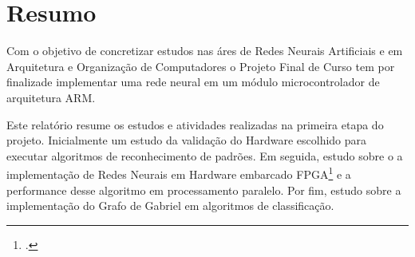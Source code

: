 \section{Resumo}


Com o objetivo de concretizar estudos nas áres de Redes Neurais Artificiais e
em Arquitetura e Organização de Computadores o Projeto Final de Curso tem por finalizade
implementar uma rede neural em um módulo microcontrolador de arquitetura ARM.

Este relatório resume os estudos e atividades realizadas na primeira etapa do projeto.
Inicialmente um estudo da validação do Hardware escolhido para executar algoritmos de reconhecimento
de padrões. Em seguida, estudo sobre o a implementação de Redes Neurais em Hardware embarcado FPGA\footcite{FPGA: field programmable gate array}
e a performance desse algoritmo em processamento paralelo. Por fim, estudo sobre a implementação do Grafo de Gabriel 
em algoritmos de classificação. 



